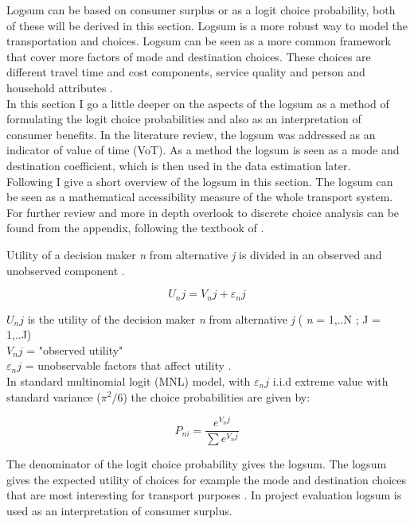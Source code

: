 Logsum can be based on consumer surplus or as a logit choice probability, both of these will be derived in this section. Logsum is a more robust way to model the transportation and choices. Logsum can be seen as a more common framework that cover more factors of mode and destination choices. These choices are different travel time and cost components, service quality and person and household attributes \citep{logsum}. \\

In this section I go a little deeper on the aspects of the logsum as a method of formulating the logit choice probabilities and also as an interpretation of consumer benefits. In the literature review, the logsum was addressed as an indicator of value of time (VoT). As a method the logsum is seen as a mode and destination coefficient, which is then used in the data estimation later. \\

Following \citep{logsum} I give a short overview of the logsum in this section. The logsum can be seen as a mathematical accessibility measure of the whole transport system. For further review and more in depth overlook to discrete choice analysis can be found from the appendix, following the textbook of \citep{train}.

Utility of a decision maker \textit{n} from alternative \textit{j} is divided in an observed and unobserved component \citep{logsum}.

\begin{equation}
U_nj = V_nj + \varepsilon_nj
\end{equation}

$U_nj$ is the utility of the decision maker \textit{n} from alternative \textit{j} ( \textit{n} = 1,..N ; J = 1,..J) \\
$V_nj$ = "observed utility" \\
$\varepsilon_nj$ = unobservable factors that affect utility \citep{logsum}. \\

In standard multinomial logit (MNL) model, with $\varepsilon_nj$ i.i.d extreme value with standard variance ($\pi^2/6$) the choice probabilities are given by:

\begin{equation}
P_{ni} = \frac{e^{V_nj}}{\sum e^{V_nj}}
\end{equation}

The denominator of the logit choice probability gives the logsum. The logsum gives the expected utility of choices for example the mode and destination choices that are most interesting for transport purposes \citep{logsum}. In project evaluation logsum is used as an interpretation of consumer surplus. \\

